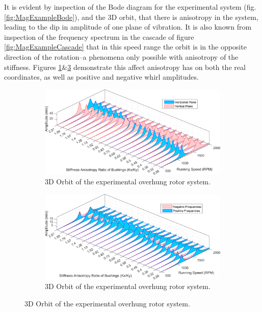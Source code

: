 It is evident by inspection of the Bode diagram for the experimental system (fig.\ref{fig:MagExampleBode}), and the 3D orbit, that there is anisotropy in the system, leading to the dip in amplitude of one plane of vibration. It is also known from inspection of the frequency spectrum in the cascade of figure \ref{fig:MagExampleCascade} that in this speed range the orbit is in the opposite direction of the rotation--a phenomena only possible with anisotropy of the stiffness. Figures \ref{fig:HorVertStiffAniCompare}\&\ref{fig:PosNegStiffAniCompare} demonstrate this affect anisotropy has on both the real coordinates, as well as positive and negative whirl amplitudes. \par 
\begin{figure}
\begin{subfigure}{\textwidth/2}
	\centering
	\includegraphics[width=\linewidth]{./figures/Images/Figure_6.png}
	\caption{3D Orbit of the experimental overhung rotor system.}
	\label{fig:HorVertStiffAniCompare}
\end{subfigure}
\begin{subfigure}{\textwidth/2}
	\centering
	\includegraphics[width=\linewidth]{./figures/Images/Figure_5.png}
	\caption{3D Orbit of the experimental overhung rotor system.}
	\label{fig:PosNegStiffAniCompare}
\end{subfigure}
\end{figure}
